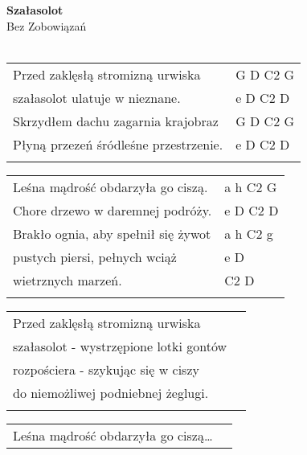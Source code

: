 \documentclass[a5paper]{article}
\begin{document}


\noindent
\fontsize{12pt}{15pt}\selectfont
\textbf{Szałasolot} \\
\fontsize{8pt}{10pt}\selectfont
Bez Zobowiązań \\ \\
\fontsize{10pt}{12pt}\selectfont
{}
\begin{tabular}{@{}p{8.00cm}p{3cm}@{}}
\noindent
Przed zaklęsłą stromizną urwiska & G D C2 G \\
szałasolot ulatuje w nieznane. & e D C2 D \\
Skrzydłem dachu zagarnia krajobraz & G D C2 G \\
Płyną przezeń śródleśne przestrzenie. & e D C2 D \\ \\
\end{tabular}

\noindent
\begin{tabular}{@{}p{7.00cm}p{3cm}@{}}
Leśna mądrość obdarzyła go ciszą. & a h C2 G \\
Chore drzewo w daremnej podróży. & e D C2 D \\
Brakło ognia, aby spełnił się żywot & a h C2 g \\
pustych piersi, pełnych wciąż & e D \\
wietrznych marzeń. & C2 D \\ \\
\end{tabular}

\noindent
\begin{tabular}{@{}p{8.50cm}p{3cm}@{}}
Przed zaklęsłą stromizną urwiska \\
szałasolot - wystrzępione lotki gontów \\
rozpościera - szykując się w ciszy \\ 
do niemożliwej podniebnej żeglugi.\\ \\
\end{tabular}

\noindent
\begin{tabular}{@{}p{7.50cm}p{3cm}@{}}
Leśna mądrość obdarzyła go ciszą…
\end{tabular}
\end{document}
